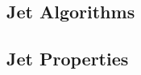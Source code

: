 \subsection{Jet Algorithms}
\label{sec:jet_algos}

\subsection{Jet Properties}

\cleardoublepage

\begin{comment}
\section{Quantum Chromodynamics}


\section{Jet Production}
The high-energy phenomenon involving quantum chromodynamics (QCD) is discussed commonly  in terms of quarks and gluons. The property of confinement is responsible for the production of jets in high energy collisions of hadrons. According to the Heisenberg uncertainity principle, the beams with high momentum probe the small distance within the  hadron. At high energy, a single parton gets probed within each incoming hadron. So the collision between two hadrons is visualised as a collision between two quarks or two gluons or a quark and a gluon. A quark or a gluon is never visible as after the collision, it begins to get separated from the rest of partons. With the increase in distance, the strength of the force of interaction increases and there is enough energy to create a particle-antiparticle pair. This process continues which leads to the formation of the stable hadrons collimated in the form of bunches. This results in the formation of the jets - spray of hadronic particles. Jets are the final structures observed in the detector. By measuring their energy and direction, we can get close to the original ``parton''. The jet definitions or algorithms are needed to precisely define the jets. The evolution of a jet is illustrated in Figure \ref{ev_j}. A parton that has not yet undergone fragmentation is sometimes referred to as a parton level jet.
A moving parton will radiate gluons and create quark-antiquark pairs by fragmentation and the resulting spray of partons is usually referred to as a parton cascade. The coloured particles within such a cascade
are combined into colourless hadrons through a process called hadronization. The shower
of produced hadrons is usually referred to as a particle level jet.
A jet reconstructed from the energy deposited in a calorimeter by a
particle level jet is referred to as a calorimeter level jet.


\end{comment}
